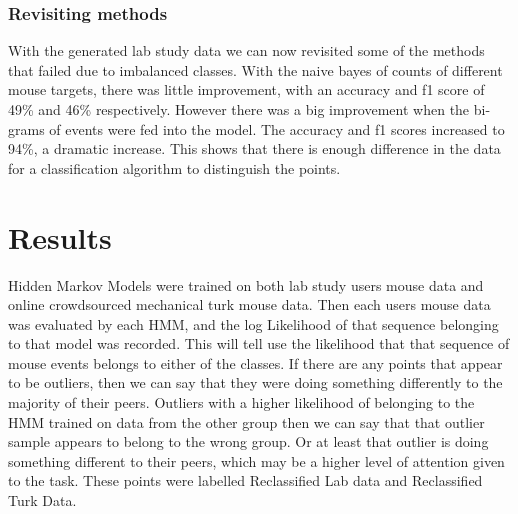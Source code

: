 \documentclass{article}
\begin{document}


\subsubsection{Revisiting methods}





With the generated lab study data we can now revisited some of the methods that failed due to imbalanced classes.
With the naive bayes of counts of different mouse targets, there was little improvement, with an accuracy and f1 score of 49\% and 46\% respectively.
However there was a big improvement when the bi-grams of events were fed into the model.
The accuracy and f1 scores increased to 94\%, a dramatic increase.
This shows that there is enough difference in the data for a classification algorithm to distinguish the points. 


\section{Results}

Hidden Markov Models were trained on both lab study users mouse data and online crowdsourced mechanical turk mouse data.
Then each users mouse data was evaluated by each HMM, and the log Likelihood of that sequence belonging to that model was recorded. 
This will tell use the likelihood that that sequence of mouse events belongs to either of the classes.
If there are any points that appear to be outliers, then we can say that they were doing something differently to the majority of their peers.
Outliers with a higher likelihood of belonging to the HMM trained on data from the other group then we can say that that outlier sample appears to belong to the wrong group.
Or at least that outlier is doing something different to their peers, which may be a higher level of attention given to the task. 
These points were labelled Reclassified Lab data and Reclassified Turk Data.
\end{document}
